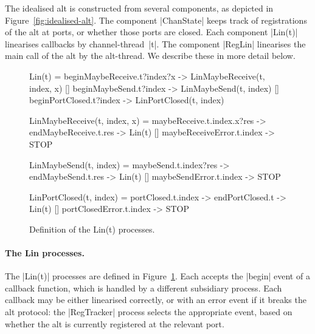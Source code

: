The idealised alt is constructed from several components, as depicted in
Figure~\ref{fig:idealised-alt}.  The component |ChanState| keeps track of
registrations of the alt at ports, or whether those ports are closed.  Each
component |Lin(t)| linearises callbacks by channel-thread~|t|.  The component
|RegLin| linearises the main call of the alt by the alt-thread.  We describe
these in more detail below.


\begin{figure}
\begin{cspm}
Lin(t) = 
  beginMaybeReceive.t?index?x -> LinMaybeReceive(t, index, x)
  [] beginMaybeSend.t?index -> LinMaybeSend(t, index)
  [] beginPortClosed.t?index -> LinPortClosed(t, index)
  
LinMaybeReceive(t, index, x) = 
  maybeReceive.t.index.x?res -> endMaybeReceive.t.res -> Lin(t)
  [] maybeReceiveError.t.index -> STOP
  
LinMaybeSend(t, index) = 
  maybeSend.t.index?res -> endMaybeSend.t.res -> Lin(t)
  [] maybeSendError.t.index -> STOP
  
LinPortClosed(t, index) = 
  portClosed.t.index -> endPortClosed.t -> Lin(t)
  [] portClosedError.t.index -> STOP
\end{cspm}
\caption{Definition of the {\scalastyle Lin(t)}
  processes.  \label{fig:alt-lin}} 
\end{figure}


\paragraph{The {\scalastyle Lin} processes.}

The |Lin(t)| processes are defined in Figure~\ref{fig:alt-lin}.  Each accepts
the |begin| event of a callback function, which is handled by a different
subsidiary process.  Each callback may be either linearised correctly, or with
an error event if it breaks the alt protocol: the |RegTracker| process selects
the appropriate event, based on whether the alt is currently registered at the
relevant port.


